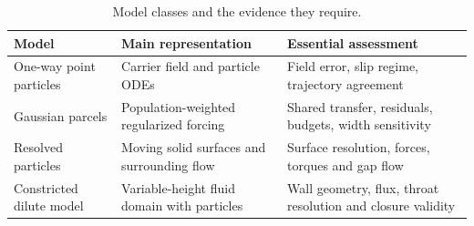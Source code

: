 \begin{table}[htbp]\centering\small
\caption{Model classes and the evidence they require.}\label{tab:model_comparison}
\begin{tabularx}{\textwidth}{@{}p{}YY@{}}\toprule
Model & Main representation & Essential assessment\\\midrule
One-way point particles & Carrier field and particle ODEs & Field error, slip regime, trajectory agreement\\
Gaussian parcels & Population-weighted regularized forcing & Shared transfer, residuals, budgets, width sensitivity\\
Resolved particles & Moving solid surfaces and surrounding flow & Surface resolution, forces, torques and gap flow\\
Constricted dilute model & Variable-height fluid domain with particles & Wall geometry, flux, throat resolution and closure validity\\
\bottomrule\end{tabularx}
\end{table}
